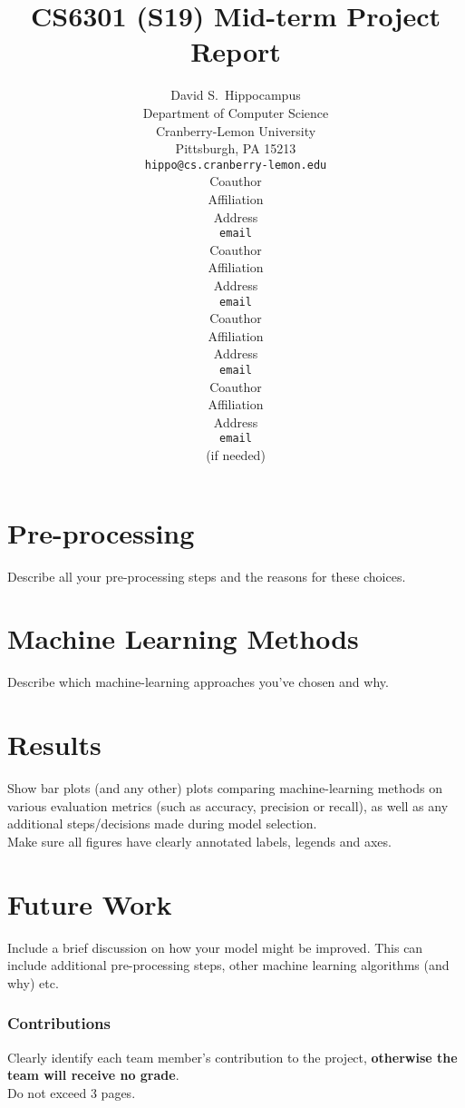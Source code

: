 \documentclass{article} %
\title{CS6301 (S19) Mid-term Project Report}
\author{
David S.~Hippocampus \\
Department of Computer Science\\
Cranberry-Lemon University\\
Pittsburgh, PA 15213 \\
\texttt{hippo@cs.cranberry-lemon.edu} \\
\And
Coauthor \\
Affiliation \\
Address \\
\texttt{email} \\
\AND
Coauthor \\
Affiliation \\
Address \\
\texttt{email} \\
\And
Coauthor \\
Affiliation \\
Address \\
\texttt{email} \\
\And
Coauthor \\
Affiliation \\
Address \\
\texttt{email} \\
(if needed)\\
}
\begin{document}
\maketitle

\section{Pre-processing}

Describe all your pre-processing steps and the reasons for these choices.



\section{Machine Learning Methods}
\label{gen_inst}
Describe which machine-learning approaches you've chosen and why.

\section{Results}
\label{results}

Show bar plots (and any other) plots comparing machine-learning methods on various evaluation metrics (such as accuracy, precision or recall), as well as any additional steps/decisions made during model selection.\\

Make sure all figures have clearly annotated labels, legends and axes.

\section{Future Work}
Include a brief discussion on how your model might be improved. This can include additional pre-processing steps, other machine learning algorithms (and why) etc.


\subsubsection*{Contributions}

Clearly identify each team member's contribution to the project, {\bf otherwise the team will receive no grade}.\\

Do not exceed 3 pages.
\end{document}
